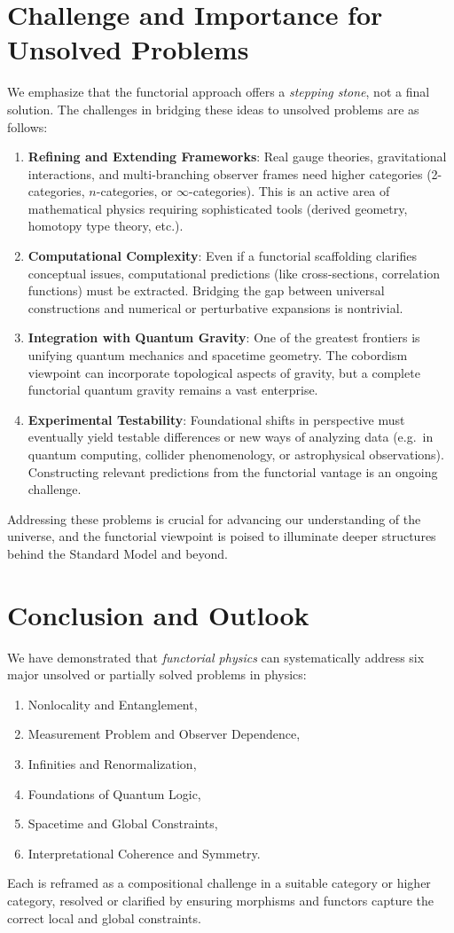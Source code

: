 \documentclass[12pt]{article}
\begin{document}
\section{Challenge and Importance for Unsolved Problems}
\label{sec:Challenges}
We emphasize that the functorial approach offers a \emph{stepping stone}, not a final solution. The challenges in bridging these ideas to unsolved problems are as follows:
\begin{enumerate}[label=\arabic*., leftmargin=2em]
\item \textbf{Refining and Extending Frameworks}: Real gauge theories, gravitational interactions, and multi-branching observer frames need higher categories (2-categories, $n$-categories, or $\infty$-categories). This is an active area of mathematical physics requiring sophisticated tools (derived geometry, homotopy type theory, etc.).
\item \textbf{Computational Complexity}: Even if a functorial scaffolding clarifies conceptual issues, computational predictions (like cross-sections, correlation functions) must be extracted. Bridging the gap between universal constructions and numerical or perturbative expansions is nontrivial.
\item \textbf{Integration with Quantum Gravity}: One of the greatest frontiers is unifying quantum mechanics and spacetime geometry. The cobordism viewpoint can incorporate topological aspects of gravity, but a complete functorial quantum gravity remains a vast enterprise.
\item \textbf{Experimental Testability}: Foundational shifts in perspective must eventually yield testable differences or new ways of analyzing data (e.g.\ in quantum computing, collider phenomenology, or astrophysical observations). Constructing relevant predictions from the functorial vantage is an ongoing challenge.
\end{enumerate}
Addressing these problems is crucial for advancing our understanding of the universe, and the functorial viewpoint is poised to illuminate deeper structures behind the Standard Model and beyond.

\section{Conclusion and Outlook}
We have demonstrated that \emph{functorial physics} can systematically address six major unsolved or partially solved problems in physics:
\begin{enumerate}[label=(\alph*)]
\item Nonlocality and Entanglement,
\item Measurement Problem and Observer Dependence,
\item Infinities and Renormalization,
\item Foundations of Quantum Logic,
\item Spacetime and Global Constraints,
\item Interpretational Coherence and Symmetry.
\end{enumerate}
Each is reframed as a compositional challenge in a suitable category or higher category, resolved or clarified by ensuring morphisms and functors capture the correct local and global constraints.
\end{document}

